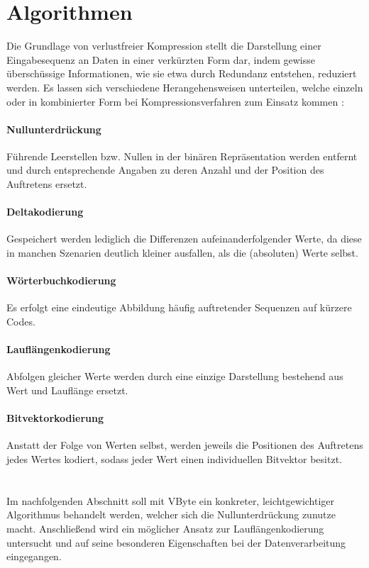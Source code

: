 \section{Algorithmen}

Die Grundlage von verlustfreier Kompression stellt die Darstellung einer Eingabesequenz an Daten in einer verkürzten Form dar, indem gewisse überschüssige Informationen, wie sie etwa durch Redundanz entstehen, reduziert werden. Es lassen sich verschiedene Herangehensweisen unterteilen, welche einzeln oder in kombinierter Form bei Kompressionsverfahren zum Einsatz kommen \cite{Abadi2006}\cite{Croft2009}:

\paragraph{Nullunterdrückung}
Führende Leerstellen bzw. Nullen in der binären Repräsentation werden entfernt und durch entsprechende Angaben zu deren Anzahl und der Position des Auftretens ersetzt.

\paragraph{Deltakodierung}
Gespeichert werden lediglich die Differenzen aufeinanderfolgender Werte, da diese in manchen Szenarien deutlich kleiner ausfallen, als die (absoluten) Werte selbst.

\paragraph{Wörterbuchkodierung}
Es erfolgt eine eindeutige Abbildung häufig auftretender Sequenzen auf kürzere Codes.

\paragraph{Lauflängenkodierung}
Abfolgen gleicher Werte werden durch eine einzige Darstellung bestehend aus Wert und Lauflänge ersetzt.

\paragraph{Bitvektorkodierung}
Anstatt der Folge von Werten selbst, werden jeweils die Positionen des Auftretens jedes Wertes kodiert, sodass jeder Wert einen individuellen Bitvektor besitzt.

\paragraph{} \mbox{} \\
\noindent Im nachfolgenden Abschnitt soll mit VByte ein konkreter, leichtgewichtiger Algorithmus behandelt werden, welcher sich die Nullunterdrückung zunutze macht. Anschließend wird ein möglicher Ansatz zur Lauflängenkodierung untersucht und auf seine besonderen Eigenschaften bei der Datenverarbeitung eingegangen.

